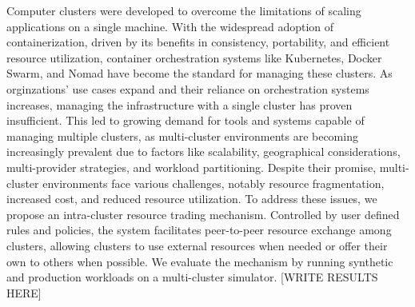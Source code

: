 Computer clusters were developed to overcome the limitations of scaling
applications on a single machine. With the widespread adoption of
containerization, driven by its benefits in consistency, portability, and
efficient resource utilization, container orchestration systems like
Kubernetes, Docker Swarm, and Nomad have become the standard for managing these
clusters. As orginzations' use cases expand and their reliance on orchestration
systems increases, managing the infrastructure with a single cluster has proven
insufficient. This led to growing demand for tools and systems capable of
managing multiple clusters, as multi-cluster environments are becoming
increasingly prevalent due to factors like scalability, geographical
considerations, multi-provider strategies, and workload partitioning. Despite
their promise, multi-cluster environments face various challenges, notably
resource fragmentation, increased cost, and reduced resource utilization. To
address these issues, we propose an intra-cluster resource trading mechanism.
Controlled by user defined rules and policies, the system facilitates
peer-to-peer resource exchange among clusters, allowing clusters to use
external resources when needed or offer their own to others when possible. We
evaluate the mechanism by running synthetic and production workloads on a
multi-cluster simulator. [WRITE RESULTS HERE]
